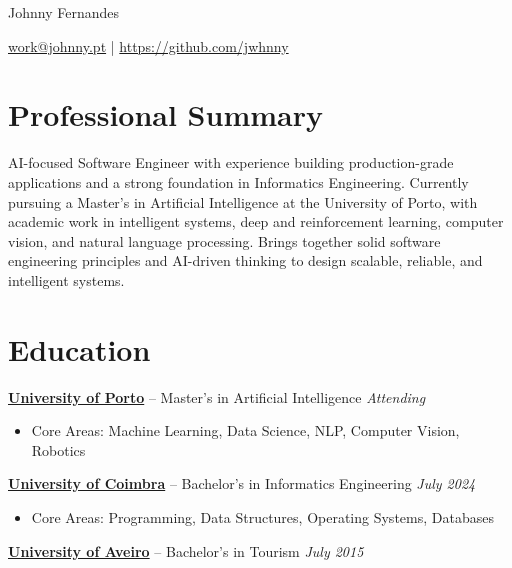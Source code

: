 \documentclass[11pt]{article}
\begin{document}
\centerline{\Huge Johnny Fernandes}

\vspace{5pt}


\centerline{\href{mailto:work@johnny.pt}{work@johnny.pt} | \href{https://github.com/jwhnny}{https://github.com/jwhnny}}

\vspace{-10pt}

\section*{Professional Summary}
AI-focused Software Engineer with experience building production-grade applications and a strong foundation in Informatics Engineering. Currently pursuing a Master's in Artificial Intelligence at the University of Porto, with academic work in intelligent systems, deep and reinforcement learning, computer vision, and natural language processing. Brings together solid software engineering principles and AI-driven thinking to design scalable, reliable, and intelligent systems.


\vspace{-8.5pt}

\section*{Education}
\textbf{\href{https://fe.up.pt/estudar/mia/?lang=en}{University of Porto}} -- Master's in Artificial Intelligence \hfill \textit{Attending} \\
\vspace{-4pt}
\begin{itemize}[noitemsep, topsep=0pt]
  \item Core Areas: Machine Learning, Data Science, NLP, Computer Vision, Robotics
\end{itemize}

\textbf{\href{https://apps.uc.pt/courses/EN/course/362}{University of Coimbra}} -- Bachelor's in Informatics Engineering \hfill \textit{July 2024} \\
\vspace{-4pt}
\begin{itemize}[noitemsep, topsep=0pt]
  \item Core Areas: Programming, Data Structures, Operating Systems, Databases
\end{itemize}

\textbf{\href{https://www.ua.pt/en/curso/452}{University of Aveiro}} -- Bachelor's in Tourism \hfill \textit{July 2015}
\end{document}
